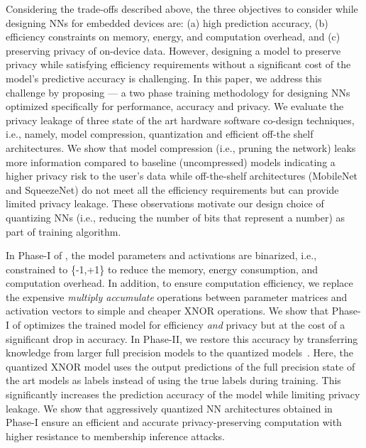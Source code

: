 Considering the trade-offs described above, the three objectives to consider while designing NNs for embedded devices are: (a) high prediction accuracy, (b) efficiency constraints on memory, energy, and computation overhead, and (c) preserving privacy of on-device data.
However, designing a model to preserve privacy while satisfying efficiency requirements without a significant cost of the model’s predictive accuracy is challenging.
In this paper, we address this challenge by proposing \method\hspace{0.02in} — a two phase training methodology for designing NNs optimized specifically for performance, accuracy and privacy.
We evaluate the privacy leakage of three state of the art hardware software co-design techniques, i.e., namely, model compression, quantization and efficient off-the shelf architectures.
We show that model compression (i.e., pruning the network) leaks more information compared to baseline (uncompressed) models indicating a higher privacy risk to the user’s data while off-the-shelf architectures (MobileNet and SqueezeNet) do not meet all the efficiency requirements but can provide limited privacy leakage.
These observations motivate our design choice of quantizing NNs (i.e., reducing the number of bits that represent a number) as part of \method\hspace{0.02in} training algorithm.

In Phase-I of \method, the model parameters and activations are binarized, i.e., constrained to \{-1,+1\} to reduce the memory, energy consumption, and computation overhead.
In addition, to ensure computation efficiency, we replace the expensive \textit{multiply accumulate} operations between parameter matrices and activation vectors to simple and cheaper XNOR operations.
We show that Phase-I of \method\hspace{0.02in} optimizes the trained model for efficiency \textit{and} privacy but at the cost of a significant drop in accuracy.
In Phase-II, we restore this accuracy by transferring knowledge from larger full precision models to the quantized models~\cite{44873}.
Here, the quantized XNOR model uses the output predictions of the full precision state of the art models as labels instead of using the true labels during training.
This significantly increases the prediction accuracy of the model while limiting privacy leakage.
We show that aggressively quantized NN architectures obtained in Phase-I ensure an efficient and accurate privacy-preserving computation with higher resistance to membership inference attacks.




